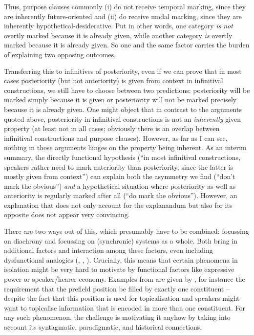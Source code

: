 \documentclass[output=paper,hidelinks]{langscibook}
\begin{document}
Thus, purpose clauses commonly (i) do not receive temporal marking, since they are inherently future-oriented and (ii) do receive modal marking, since they are inherently hypothetical-desiderative. Put in other words, one category \emph{is not} overtly marked because it is already given, while another category \emph{is} overtly marked because it is already given. So one and the same factor carries the burden of explaining two opposing outcomes.

Transferring this to infinitives of posteriority, even if we can prove that in most cases posteriority (but not anteriority) is given from context in infinitival constructions, we still have to choose between two predictions: posteriority will be marked simply because it is given or posteriority will not be marked precisely because it is already given. One might object that in contrast to the arguments quoted above, posteriority in infinitival constructions is not an \emph{inherently} given property (at least not in all cases; obviously there is an overlap between infinitival constructions and purpose clauses). However, as far as I can see, nothing in those arguments hinges on the property being inherent. As an interim summary, the directly functional hypothesis (“in most infinitival constructions, speakers rather need to mark anteriority than posteriority, since the latter is mostly given from context”) can explain both the asymmetry we find (“don’t mark the obvious”) \emph{and} a hypothetical situation where posteriority as well as anteriority is regularly marked after all (“do mark the obvious”). However, an explanation that does not only account for the explanandum but also for its opposite does not appear very convincing.

There are two ways out of this, which presumably have to be combined: focussing on diachrony and focussing on (synchronic) systems as a whole. Both bring in additional factors and interaction among these factors, even including dysfunctional analogies (\citealt[161–164]{Newmeyer1998}, \citealt{Seiler2015}, \citealt[3]{CristofaroZúñiga2018}). Crucially, this means that certain phenomena in isolation might be very hard to motivate by functional factors like expressive power or speaker/hearer economy. Examples from  are given by \citet[246]{Seiler2015}, for instance the requirement that the prefield position be filled by exactly one constituent – despite the fact that this position is used for topicalisation and speakers might want to topicalise information that is encoded in more than one constituent. For any such phenomenon, the challenge is motivating it anyhow by taking into account its syntagmatic, paradigmatic, and historical connections.
\end{document}
